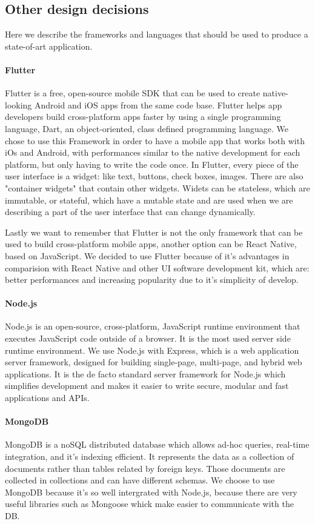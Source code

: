 \subsection{Other design decisions}
Here we describe the frameworks and languages that should be used to produce a state-of-art application.

\paragraph{Flutter}
Flutter is a free, open-source mobile SDK that can be used to create native-looking Android and iOS apps from the same code base. Flutter helps app developers build cross-platform apps faster by using a single programming language, Dart, an object-oriented, class defined programming language.
We chose to use this Framework in order to have a mobile app that works both with iOs and Android, with performances similar to the native development for each platform, but only having to write the code once.
In Flutter, every piece of the user interface is a widget: like text, buttons, check boxes, images. There are also "container widgets" that contain other widgets. Widets can be stateless, which are immutable, or stateful, which have a mutable state and are used when we are describing a part of the user interface that can change dynamically.

Lastly we want to remember that Flutter is not the only framework that can be used to build cross-platform mobile apps, another option can be React Native, based on JavaScript.
We decided to use Flutter because of it's advantages in comparision with React Native and other UI software development kit, which are: better performances and increasing popularity due to it's simplicity of develop.

\paragraph{Node.js}
Node.js is an open-source, cross-platform, JavaScript runtime environment that executes JavaScript code outside of a browser. It is the most used server side runtime environment.
We use Node.js with Express, which is a web application server framework, designed for building single-page, multi-page, and hybrid web applications. It is the de facto standard server framework for Node.js which simplifies development and makes it easier to write secure, modular and fast applications and APIs.

\paragraph{MongoDB}
MongoDB is a noSQL distributed database which allows ad-hoc queries, real-time integration, and it's indexing efficient. It represents the data as a collection of documents rather than tables related by foreign keys. Those documents are collected in collections and can have different schemas. We choose to use MongoDB because it's so well intergrated with Node.js, because there are very useful libraries such as Mongoose whick make easier to communicate with the DB.
